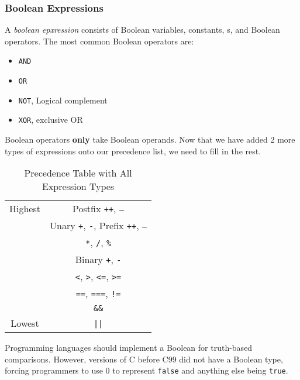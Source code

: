 \subsubsection{Boolean Expressions}\label{subsubsec:Boolean_Expressions}
\begin{definition}\label{def:Boolean_Expression}
  A \emph{boolean epxression} consists of Boolean variables, constants, s, and Boolean operators.
  The most common Boolean operators are:
  \begin{itemize}[noitemsep]
  \item \texttt{AND}
  \item \texttt{OR}
  \item \texttt{NOT}, Logical complement
  \item \texttt{XOR}, exclusive OR
  \end{itemize}
\end{definition}

Boolean operators \textbf{only} take Boolean operands.
Now that we have added 2 more types of expressions onto our precedence list, we need to fill in the rest.

\begin{table}[h!]
  \centering
  \begin{tabular}{cc}
    \toprule
    Highest & Postfix \texttt{++}, \texttt{--} \\
            & Unary \texttt{+}, \texttt{-}, Prefix \texttt{++}, \texttt{--} \\
            & \texttt{*}, \texttt{/}, \texttt{\%} \\
            & Binary \texttt{+}, \texttt{-} \\
            & \texttt{<}, \texttt{>}, \texttt{<=}, \texttt{>=} \\
            & \texttt{==}, \texttt{===}, \texttt{!=} \\
            & \texttt{\&\&} \\
    Lowest & \texttt{||} \\
    \bottomrule
  \end{tabular}
  \caption{Precedence Table with All Expression Types}
  \label{tab:Precedence_Table_with_All_Expression_Types}
\end{table}

Programming languages should implement a Boolean  for truth-based comparisons.
However, versions of C before C99 did not have a Boolean type, forcing programmers to use 0 to represent \texttt{false} and anything else being \texttt{true}.


